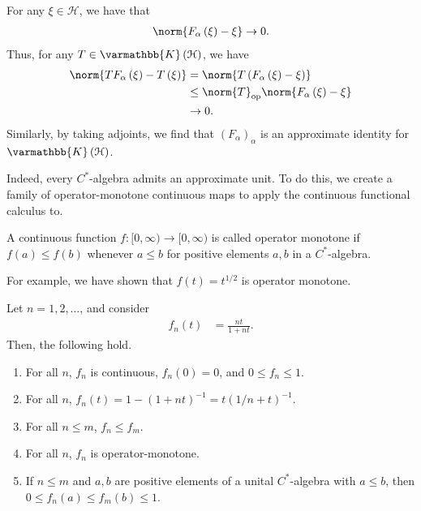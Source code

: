\documentclass[10pt]{mypackage}
\renewcommand*{\mathbb}[1]{\varmathbb{#1}}
\newcommand{\K}{\mathbb{K}}
\DeclareMathOperator{\op}{op}
\begin{document}
\begin{solution}
  For any $\xi\in \mathcal{H}$, we have that
  \begin{align*}
    \norm{F_{\alpha}\left(\xi\right) - \xi}\rightarrow 0.
  \end{align*}
  Thus, for any $T\in \K\left(\mathcal{H}\right)$, we have
  \begin{align*}
    \norm{TF_{\alpha}\left(\xi\right) - T\left(\xi\right)} &= \norm{T\left(F_{\alpha}\left(\xi\right) - \xi\right)}\\
                                                           &\leq \norm{T}_{\op}\norm{F_{\alpha}\left(\xi\right) - \xi}\\
                                                           &\rightarrow 0.
  \end{align*}
  Similarly, by taking adjoints, we find that $\left(F_{\alpha}\right)_{\alpha}$ is an approximate identity for $\K\left(\mathcal{H}\right)$.
\end{solution}
Indeed, every $C^{\ast}$-algebra admits an approximate unit. To do this, we create a family of operator-monotone continuous maps to apply the continuous functional calculus to.
\begin{definition}
  A continuous function $f\colon [0,\infty)\rightarrow [0,\infty)$ is called operator monotone if $f\left(a\right) \leq f\left(b\right)$ whenever $a\leq b$ for positive elements $a,b$ in a $C^{\ast}$-algebra.
\end{definition}
For example, we have shown that $f(t) = t^{1/2}$ is operator monotone.
\begin{lemma}
  Let $n = 1,2,\dots$, and consider
  \begin{align*}
    f_n\left(t\right) &= \frac{nt}{1 + nt}.
  \end{align*}
  Then, the following hold.
  \begin{enumerate}[(1)]
    \item For all $n$, $f_n$ is continuous, $f_n(0) = 0$, and $0 \leq f_n \leq 1$.
    \item For all $n$, $f_n(t) = 1 - \left(1+nt\right)^{-1} = t\left(1/n + t\right)^{-1} $.
    \item For all $n\leq m$, $f_n\leq f_m$.
    \item For all $n$, $f_n$ is operator-monotone.
    \item If $n\leq m$ and $a,b$ are positive elements of a unital $C^{\ast}$-algebra with $a\leq b$, then $0\leq f_n\left(a\right)\leq f_m\left(b\right) \leq 1$.
  \end{enumerate}
\end{lemma}
\end{document}
